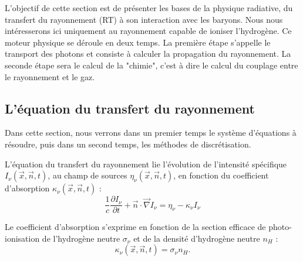 L'objectif de cette section est de présenter les bases de la physique radiative, du transfert du rayonnement (RT) à son interaction avec les baryons.
Nous nous intéresserons ici uniquement au rayonnement capable de ioniser l'hydrogène.
Ce moteur physique se déroule en deux temps.
La première étape s'appelle le transport des photons et consiste à calculer la propagation du rayonnement.
La seconde étape sera le calcul de la "chimie", c'est à dire le calcul du couplage entre le rayonnement et le gaz.

\subsection{L'équation du transfert du rayonnement}

Dans cette section, nous verrons dans un premier temps le système d'équations à résoudre, puis dans un second temps, les méthodes de discrétisation.

L'équation du transfert du rayonnement lie l'évolution de l'intensité spécifique $I_\nu(\vec{x},\vec{n},t)$, au champ de sources $\eta_\nu(\vec{x},\vec{n},t)$, en fonction du coefficient d'absorption $\kappa_\nu(\vec{x},\vec{n},t)$ :
\begin{equation}
\frac{1}{c} \frac{\partial I_\nu}{\partial t} + \vec{n}\cdot \vec{\nabla} I_\nu = \eta_\nu - \kappa_\nu I_\nu 
\label{eq:rad}
\end{equation}

Le coefficient d'absorption s'exprime en fonction de la section efficace de photo-ionisation de l'hydrogène neutre $\sigma_\nu$ et de la densité d'hydrogène neutre $n_H$ :
\begin{equation}
\kappa_\nu(\vec{x},\vec{n},t) = \sigma_\nu n_H.
\end{equation}

